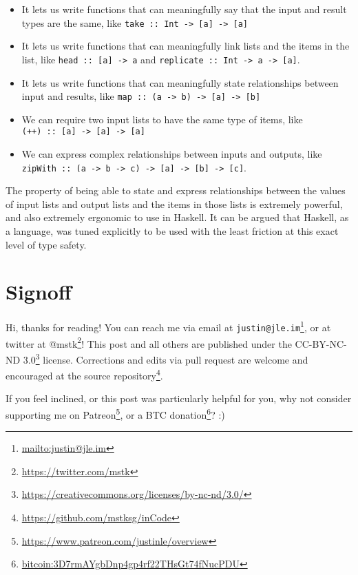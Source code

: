 \documentclass[]{article}
\renewcommand{\href}[2]{#2\footnote{\url{#1}}}
\begin{document}
\begin{itemize}
\tightlist
\item
  It lets us write functions that can meaningfully say that the input and result
  types are the same, like
  \texttt{take\ ::\ Int\ -\textgreater{}\ {[}a{]}\ -\textgreater{}\ {[}a{]}}
\item
  It lets us write functions that can meaningfully link lists and the items in
  the list, like \texttt{head\ ::\ {[}a{]}\ -\textgreater{}\ a} and
  \texttt{replicate\ ::\ Int\ -\textgreater{}\ a\ -\textgreater{}\ {[}a{]}}.
\item
  It lets us write functions that can meaningfully state relationships between
  input and results, like
  \texttt{map\ ::\ (a\ -\textgreater{}\ b)\ -\textgreater{}\ {[}a{]}\ -\textgreater{}\ {[}b{]}}
\item
  We can require two input lists to have the same type of items, like
  \texttt{(++)\ ::\ {[}a{]}\ -\textgreater{}\ {[}a{]}\ -\textgreater{}\ {[}a{]}}
\item
  We can express complex relationships between inputs and outputs, like
  \texttt{zipWith\ ::\ (a\ -\textgreater{}\ b\ -\textgreater{}\ c)\ -\textgreater{}\ {[}a{]}\ -\textgreater{}\ {[}b{]}\ -\textgreater{}\ {[}c{]}}.
\end{itemize}

The property of being able to state and express relationships between the values
of input lists and output lists and the items in those lists is extremely
powerful, and also extremely ergonomic to use in Haskell. It can be argued that
Haskell, as a language, was tuned explicitly to be used with the least friction
at this exact level of type safety.

\hypertarget{signoff}{%
\section{Signoff}\label{signoff}}

Hi, thanks for reading! You can reach me via email at
\href{mailto:justin@jle.im}{\nolinkurl{justin@jle.im}}, or at twitter at
\href{https://twitter.com/mstk}{@mstk}! This post and all others are published
under the \href{https://creativecommons.org/licenses/by-nc-nd/3.0/}{CC-BY-NC-ND
3.0} license. Corrections and edits via pull request are welcome and encouraged
at \href{https://github.com/mstksg/inCode}{the source repository}.

If you feel inclined, or this post was particularly helpful for you, why not
consider \href{https://www.patreon.com/justinle/overview}{supporting me on
Patreon}, or a \href{bitcoin:3D7rmAYgbDnp4gp4rf22THsGt74fNucPDU}{BTC donation}?
:)
\end{document}

